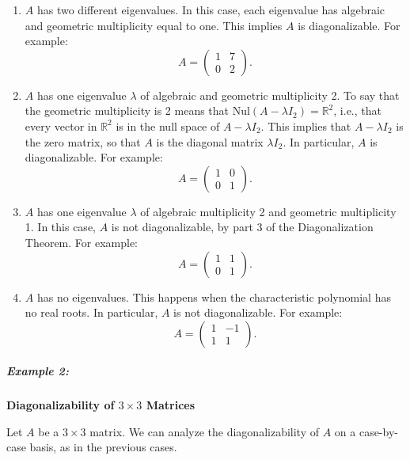 \documentclass[a4paper,12pt]{article}
\begin{document}
\begin{enumerate}
    \item \( A \) has two different eigenvalues. In this case, each eigenvalue has algebraic and geometric multiplicity equal to one. This implies \( A \) is diagonalizable. For example:
    \[
    A = \begin{pmatrix} 1 & 7 \\ 0 & 2 \end{pmatrix}.
    \]
    \item \( A \) has one eigenvalue \( \lambda \) of algebraic and geometric multiplicity 2. To say that the geometric multiplicity is 2 means that \( \text{Nul}(A - \lambda I_2) = \mathbb{R}^2 \), i.e., that every vector in \( \mathbb{R}^2 \) is in the null space of \( A - \lambda I_2 \). This implies that \( A - \lambda I_2 \) is the zero matrix, so that \( A \) is the diagonal matrix \( \lambda I_2 \). In particular, \( A \) is diagonalizable. For example:
    \[
    A = \begin{pmatrix} 1 & 0 \\ 0 & 1 \end{pmatrix}.
    \]
    \item \( A \) has one eigenvalue \( \lambda \) of algebraic multiplicity 2 and geometric multiplicity 1. In this case, \( A \) is not diagonalizable, by part 3 of the Diagonalization Theorem. For example:
    \[
    A = \begin{pmatrix} 1 & 1 \\ 0 & 1 \end{pmatrix}.
    \]
    \item \( A \) has no eigenvalues. This happens when the characteristic polynomial has no real roots. In particular, \( A \) is not diagonalizable. For example:
    \[
    A = \begin{pmatrix} 1 & -1 \\ 1 & 1 \end{pmatrix}.
    \]
\end{enumerate}

\subparagraph{Example 2:}\textbf{Diagonalizability of \( 3 \times 3 \) Matrices}

Let \( A \) be a \( 3 \times 3 \) matrix. We can analyze the diagonalizability of \( A \) on a case-by-case basis, as in the previous cases.
\end{document}
